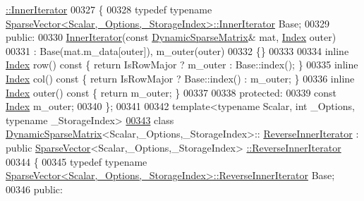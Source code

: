 \begin{DoxyCode}
      \hyperlink{class_eigen_1_1_dynamic_sparse_matrix_1_1_inner_iterator}{::InnerIterator}
00327 \{
00328     \textcolor{keyword}{typedef} \textcolor{keyword}{typename} \hyperlink{class_eigen_1_1_sparse_compressed_base_1_1_inner_iterator}{SparseVector<Scalar,\_Options,\_StorageIndex>::InnerIterator}
       Base;
00329   \textcolor{keyword}{public}:
00330     \hyperlink{class_eigen_1_1_dynamic_sparse_matrix_1_1_inner_iterator}{InnerIterator}(\textcolor{keyword}{const} \hyperlink{class_eigen_1_1_dynamic_sparse_matrix}{DynamicSparseMatrix}& mat, 
      \hyperlink{namespace_eigen_a62e77e0933482dafde8fe197d9a2cfde}{Index} outer)
00331       : Base(mat.m\_data[outer]), m\_outer(outer)
00332     \{\}
00333 
00334     \textcolor{keyword}{inline} \hyperlink{namespace_eigen_a62e77e0933482dafde8fe197d9a2cfde}{Index} row()\textcolor{keyword}{ const }\{ \textcolor{keywordflow}{return} IsRowMajor ? m\_outer : Base::index(); \}
00335     \textcolor{keyword}{inline} \hyperlink{namespace_eigen_a62e77e0933482dafde8fe197d9a2cfde}{Index} col()\textcolor{keyword}{ const }\{ \textcolor{keywordflow}{return} IsRowMajor ? Base::index() : m\_outer; \}
00336     \textcolor{keyword}{inline} \hyperlink{namespace_eigen_a62e77e0933482dafde8fe197d9a2cfde}{Index} outer()\textcolor{keyword}{ const }\{ \textcolor{keywordflow}{return} m\_outer; \}
00337 
00338   \textcolor{keyword}{protected}:
00339     \textcolor{keyword}{const} \hyperlink{namespace_eigen_a62e77e0933482dafde8fe197d9a2cfde}{Index} m\_outer;
00340 \};
00341 
00342 \textcolor{keyword}{template}<\textcolor{keyword}{typename} Scalar, \textcolor{keywordtype}{int} \_Options, \textcolor{keyword}{typename} \_StorageIndex>
\hyperlink{class_eigen_1_1_dynamic_sparse_matrix_1_1_reverse_inner_iterator}{00343} \textcolor{keyword}{class }\hyperlink{class_eigen_1_1_dynamic_sparse_matrix}{DynamicSparseMatrix}<Scalar,\_Options,\_StorageIndex>::
      \hyperlink{class_eigen_1_1_dynamic_sparse_matrix_1_1_reverse_inner_iterator}{ReverseInnerIterator} : \textcolor{keyword}{public} \hyperlink{group___sparse_core___module_class_eigen_1_1_sparse_vector}{SparseVector}<Scalar,\_Options,\_StorageIndex>
      \hyperlink{class_eigen_1_1_dynamic_sparse_matrix_1_1_reverse_inner_iterator}{::ReverseInnerIterator}
00344 \{
00345     \textcolor{keyword}{typedef} \textcolor{keyword}{typename} 
      \hyperlink{class_eigen_1_1_sparse_compressed_base_1_1_reverse_inner_iterator}{SparseVector<Scalar,\_Options,\_StorageIndex>::ReverseInnerIterator}
       Base;
00346   \textcolor{keyword}{public}:

\end{DoxyCode}
